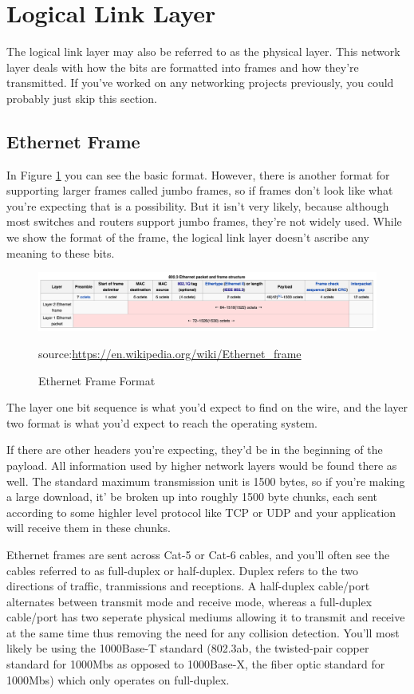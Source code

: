 \documentclass[12pt]{report}
\begin{document}
\section{Logical Link Layer}
The logical link layer may also be referred to as the physical layer.
This network layer deals with how the bits are formatted into frames and how they're transmitted.
If you've worked on any networking projects previously, you could probably just skip this section.

\subsection{Ethernet Frame}
In Figure \ref{fig:eframe} you can see the basic format. However, there is another format for supporting larger frames called jumbo frames, so if frames don't look like what you're expecting that is a possibility. But it isn't very likely, because although most switches and routers support jumbo frames, they're not widely used. While we show the format of the frame, the logical link layer doesn't ascribe any meaning to these bits.

\begin{figure}[!h]
\centering
\includegraphics[width=6in]{eframe}
\caption{Ethernet Frame Format}
\small source:\url{https://en.wikipedia.org/wiki/Ethernet_frame}
\label{fig:eframe}
\end{figure}

The layer one bit sequence is what you'd expect to find on the wire, and the layer two format is what you'd expect to reach the operating system.

If there are other headers you're expecting, they'd be in the beginning of the payload. All information used by higher network layers would be found there as well. The standard maximum transmission unit is 1500 bytes, so if you're making a large download, it' be broken up into roughly 1500 byte chunks, each sent according to some highler level protocol like TCP or UDP and your application will receive them in these chunks.

Ethernet frames are sent across Cat-5 or Cat-6 cables, and you'll often see the cables referred to as full-duplex or half-duplex. Duplex refers to the two directions of traffic, tranmissions and receptions. A half-duplex cable/port alternates between transmit mode and receive mode, whereas a full-duplex cable/port has two seperate physical mediums allowing it to transmit and receive at the same time thus removing the need for any collision detection. You'll most likely be using the 1000Base-T standard (802.3ab, the twisted-pair copper standard for 1000Mbs as opposed to 1000Base-X, the fiber optic standard for 1000Mbs) which only operates on full-duplex.
\end{document}
